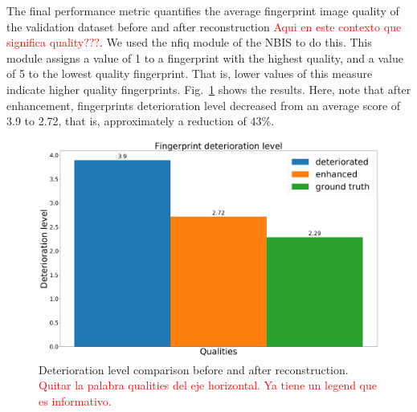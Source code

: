 \documentclass[a4paper,fleqn]{cas-dc}
\begin{document}
The final performance metric quantifies the average fingerprint image quality of the validation dataset before and after reconstruction \textcolor{red}{Aqui en este contexto que significa quality???}. We used the nfiq module of the NBIS to do this. This module assigns a value of 1 to a fingerprint with the highest quality, and a value of 5 to the lowest quality fingerprint. That is, lower values of this measure indicate higher quality fingerprints.  Fig.~\ref{fig11} shows the results. Here, note that after enhancement, fingerprints deterioration level decreased from an average score of 3.9 to 2.72, that is, approximately a reduction of 43\%.
\begin{figure}[htbp]
\centerline{\includegraphics[scale=0.13]{figs/mean_qualities.png}}
\caption{Deterioration level comparison before and after reconstruction. \textcolor{red}{Quitar la palabra qualities del eje horizontal. Ya tiene un legend que es informativo.}}
\label{fig11}
\end{figure}

\end{document}
